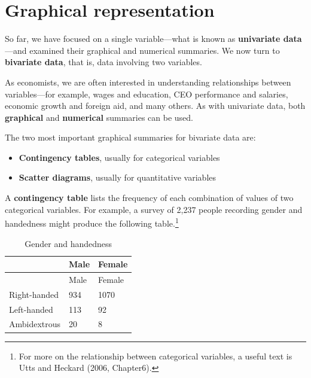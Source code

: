 \documentclass[
  letterpaper,
  DIV=11,
  numbers=noendperiod]{scrreprt}
\providecommand{\tightlist}{%
  \setlength{\itemsep}{0pt}\setlength{\parskip}{0pt}}
\begin{document}
\section{Graphical representation}\label{graphical-representation}

So far, we have focused on a single variable---what is known as
\textbf{univariate data}---and examined their graphical and numerical
summaries. We now turn to \textbf{bivariate data}, that is, data
involving two variables.

As economists, we are often interested in understanding relationships
between variables---for example, wages and education, CEO performance
and salaries, economic growth and foreign aid, and many others. As with
univariate data, both \textbf{graphical} and \textbf{numerical}
summaries can be used.

\begin{tcolorbox}[enhanced jigsaw, coltitle=black, colbacktitle=quarto-callout-note-color!10!white, left=2mm, bottomrule=.15mm, bottomtitle=1mm, colback=white, titlerule=0mm, colframe=quarto-callout-note-color-frame, breakable, leftrule=.75mm, toptitle=1mm, opacitybacktitle=0.6, rightrule=.15mm, title=\textcolor{quarto-callout-note-color}{\faInfo}\hspace{0.5em}{Key graphical tools for two variables}, arc=.35mm, opacityback=0, toprule=.15mm]

The two most important graphical summaries for bivariate data are:

\begin{itemize}
\tightlist
\item
  \textbf{Contingency tables}, usually for categorical variables\\
\item
  \textbf{Scatter diagrams}, usually for quantitative variables
\end{itemize}

\end{tcolorbox}

A \textbf{contingency table} lists the frequency of each combination of
values of two categorical variables. For example, a survey of 2,237
people recording gender and handedness might produce the following
table.\footnote{For more on the relationship between categorical
  variables, a useful text is Utts and Heckard (2006, Chapter6).}

\begin{longtable}[]{@{}lll@{}}
\caption{Gender and handedness}\label{tbl-income}\tabularnewline
\toprule\noalign{}
& Male & Female \\
\midrule\noalign{}
\endfirsthead
\toprule\noalign{}
& Male & Female \\
\midrule\noalign{}
\endhead
\bottomrule\noalign{}
\endlastfoot
Right-handed & 934 & 1070 \\
Left-handed & 113 & 92 \\
Ambidextrous & 20 & 8 \\
\end{longtable}
\end{document}
